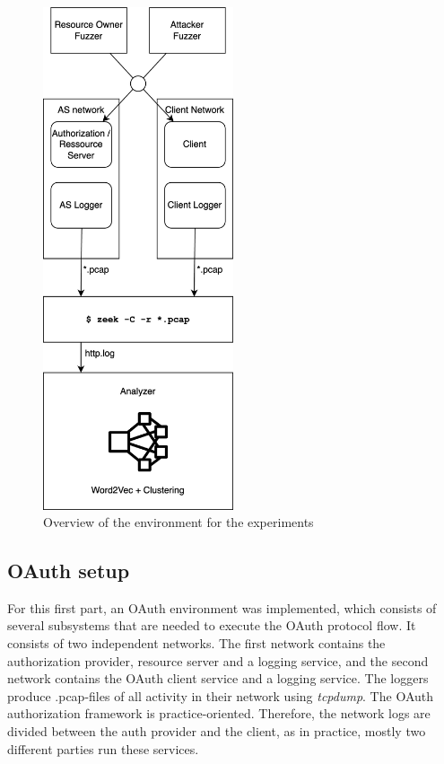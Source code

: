 \documentclass[
    fontsize=12pt,
    headings=small,
    parskip=half,           %
    bibliography=totoc,
    numbers=noenddot,       %
    open=any,               %
    ]{scrreprt}
\begin{document}
\begin{figure}[H]
	\sffamily\footnotesize
	\includegraphics[width=0.5\textwidth]{pic/experimental_setup.png}
	\unitlength=0.75mm
	\linethickness{0.4pt}
	\caption{Overview of the environment for the experiments}
	\label{fig:experimental_setup}
\end{figure}

\subsection{OAuth setup}
For this first part, an OAuth environment was implemented, which consists of several subsystems that are needed to execute the OAuth protocol flow. It consists of two independent networks. The first network contains the authorization provider, resource server and a logging service, and the second network contains the OAuth client service and a logging service. The loggers produce .pcap-files of all activity in their network using \emph{tcpdump}. The OAuth authorization framework is practice-oriented. Therefore, the network logs are divided between the auth provider and the client, as in practice, mostly two different parties run these services. 
\end{document}

